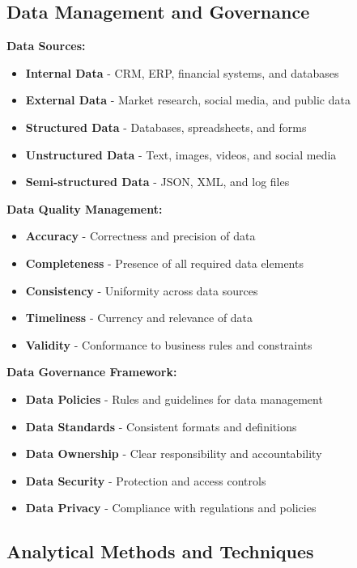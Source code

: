 \documentclass[12pt]{article}
\begin{document}
\subsection{Data Management and Governance}

\textbf{Data Sources:}
\begin{itemize}
    \item \textbf{Internal Data} - CRM, ERP, financial systems, and databases
    \item \textbf{External Data} - Market research, social media, and public data
    \item \textbf{Structured Data} - Databases, spreadsheets, and forms
    \item \textbf{Unstructured Data} - Text, images, videos, and social media
    \item \textbf{Semi-structured Data} - JSON, XML, and log files
\end{itemize}

\textbf{Data Quality Management:}
\begin{itemize}
    \item \textbf{Accuracy} - Correctness and precision of data
    \item \textbf{Completeness} - Presence of all required data elements
    \item \textbf{Consistency} - Uniformity across data sources
    \item \textbf{Timeliness} - Currency and relevance of data
    \item \textbf{Validity} - Conformance to business rules and constraints
\end{itemize}

\textbf{Data Governance Framework:}
\begin{itemize}
    \item \textbf{Data Policies} - Rules and guidelines for data management
    \item \textbf{Data Standards} - Consistent formats and definitions
    \item \textbf{Data Ownership} - Clear responsibility and accountability
    \item \textbf{Data Security} - Protection and access controls
    \item \textbf{Data Privacy} - Compliance with regulations and policies
\end{itemize}

\subsection{Analytical Methods and Techniques}
\end{document}
